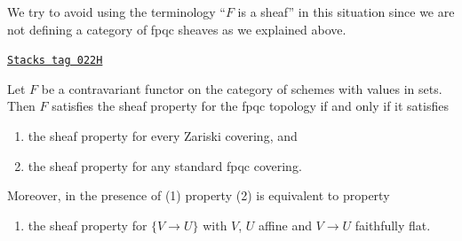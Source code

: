 We try to avoid using the terminology ``$F$ is a sheaf'' in this
situation since we are not defining a category of fpqc sheaves
as we explained above.

\begin{lemma}
\label{topologies-lemma-sheaf-property-fpqc}
\href{https://stacks.math.columbia.edu/tag/022H}{\texttt{Stacks tag 022H}}

Let $F$ be a contravariant functor on the category
of schemes with values in sets. Then $F$ satisfies
the sheaf property for the fpqc topology if and only
if it satisfies
\begin{enumerate}
\item the sheaf property for every Zariski covering, and
\item the sheaf property for any standard fpqc covering.
\end{enumerate}
Moreover, in the presence of (1) property (2) is equivalent to
property
\begin{enumerate}
\item[(2')] the sheaf property for $\{V \to U\}$
with $V$, $U$ affine and $V \to U$ faithfully flat.
\end{enumerate}
\end{lemma}

